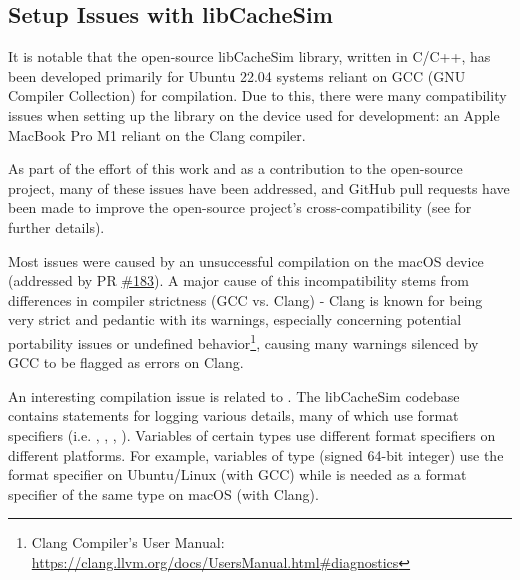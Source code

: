 




\subsection{Setup Issues with libCacheSim}\label{sec:setup-issues}

It is notable that the open-source libCacheSim library, written in C/C++, has been developed primarily for Ubuntu 22.04 systems reliant on GCC (GNU Compiler Collection) for compilation. Due to this, there were many compatibility issues when setting up the library on the device used for development: an Apple MacBook Pro M1 reliant on the Clang compiler. 

As part of the effort of this work and as a contribution to the open-source project, many of these issues have been addressed, and GitHub pull requests have been made to improve the open-source project's cross-compatibility (see  for further details).


Most issues were caused by an unsuccessful compilation on the macOS device (addressed by PR \href{https://github.com/1a1a11a/libCacheSim/pull/183}{\#183}). A major cause of this incompatibility stems from differences in compiler strictness (GCC vs. Clang) - Clang is known for being very strict and pedantic with its warnings, especially concerning potential portability issues or undefined behavior\footnote{Clang Compiler's User Manual: \url{https://clang.llvm.org/docs/UsersManual.html\#diagnostics}}, causing many warnings silenced by GCC to be flagged as errors on Clang.

An interesting compilation issue is related to . The libCacheSim codebase contains  statements for logging various details, many of which use format specifiers (i.e. , , , ). Variables of certain types use different format specifiers on different platforms. For example, variables of type  (signed 64-bit integer) use the  format specifier on Ubuntu/Linux (with GCC) while  is needed as a format specifier of the same type on macOS (with Clang). 

